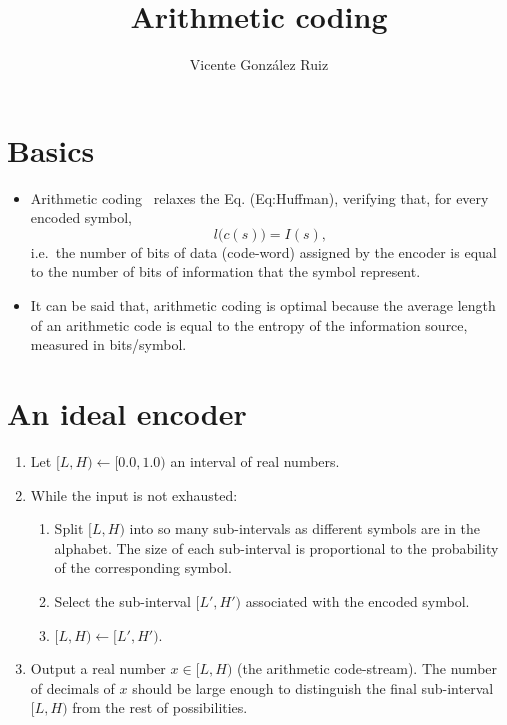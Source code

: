 \title{Arithmetic coding}
\author{Vicente González Ruiz}
\maketitle
\tableofcontents

\section{Basics}

\begin{itemize}
\tightlist
\item
  Arithmetic coding~\cite{rissanen1979arithmetic, witten1987arithmetic, nelson96datacompression} relaxes the Eq. (Eq:Huffman), verifying that, for
  every encoded symbol, \begin{equation}
    l\big(c(s)\big) = I(s), \tag{Eq:arithmetic}
  \end{equation} i.e.~the number of bits of data (code-word) assigned by
  the encoder is equal to the number of bits of information that the
  symbol represent.
\end{itemize}


\begin{itemize}
\tightlist
\item
  It can be said that, arithmetic coding is optimal because the average
  length of an arithmetic code is equal to the entropy of the
  information source, measured in bits/symbol.
\end{itemize}

\section{An ideal encoder}
\begin{enumerate}
\def\labelenumi{\arabic{enumi}.}
\tightlist
\item
  Let \([L,H)\leftarrow [0.0,1.0)\) an interval of real numbers.
\item
  While the input is not exhausted:
  \begin{enumerate}
  \def\labelenumii{\arabic{enumii}.}
  \tightlist
  \item
    Split \([L,H)\) into so many sub-intervals as different symbols are
    in the alphabet. The size of each sub-interval is proportional to
    the probability of the corresponding symbol.
  \item
    Select the sub-interval \([L',H')\) associated with the encoded
    symbol.
  \item
    \([L,H)\leftarrow [L',H')\).
  \end{enumerate}
\item
  Output a real number \(x\in[L,H)\) (the arithmetic code-stream). The
  number of decimals of \(x\) should be large enough to distinguish the
  final sub-interval \([L,H)\) from the rest of possibilities.
\end{enumerate}

